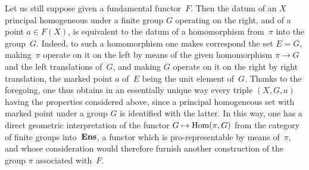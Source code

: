 \begin{remark}
Let us still suppose given a fundamental functor~$F$. Then the
datum of an
$X$ principal homogeneous under a finite group $G$ operating on
the right, and of a point $a\in F(X)$, is equivalent to the
datum of a homomorphism from~$\pi$ into the group~$G$. Indeed,
to such a homomorphism one makes correspond the set $E=G$,
making~$\pi$ operate on it on the left by means of the given homomorphism
$\pi\to G$ and the left translations of~$G$, and
making $G$ operate on it on the right by right translation, the
marked point $a$ of~$E$ being the unit element
of~$G$. Thanks to the foregoing, one thus obtains in an
essentially unique way every triple $(X, G, a)$ having the
properties considered above,
since a
principal homogeneous set with marked point under a group $G$ is identified
with the latter. In this way, one has a direct geometric
interpretation of the functor $G\mto \Hom(\pi, G)$ from the
category of finite groups into~$\mathbf{Ens}$, a functor which is
pro-representable by means of~$\pi$, and whose
consideration would therefore furnish another construction of the group
$\pi$ associated with~$F$.
\end{remark}
